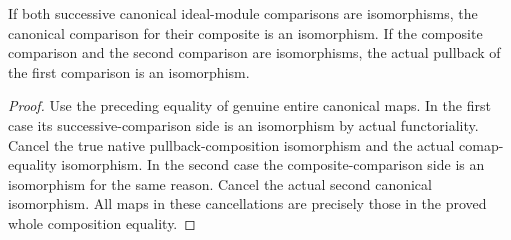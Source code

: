 \begin{lemma}
\label{lem:actual-ideal-module-canonical-pullback-comp-iso}
\leanok
{}
If both successive canonical ideal-module comparisons are isomorphisms,
the canonical comparison for their composite is an isomorphism. If the
composite comparison and the second comparison are isomorphisms, the
actual pullback of the first comparison is an isomorphism.
\end{lemma}
\begin{proof}
Use the preceding equality of genuine entire canonical maps. In the
first case its successive-comparison side is an isomorphism by actual
functoriality. Cancel the true native pullback-composition isomorphism
and the actual comap-equality isomorphism. In the second case the
composite-comparison side is an isomorphism for the same reason. Cancel
the actual second canonical isomorphism. All maps in these cancellations
are precisely those in the proved whole composition equality.
\end{proof}
